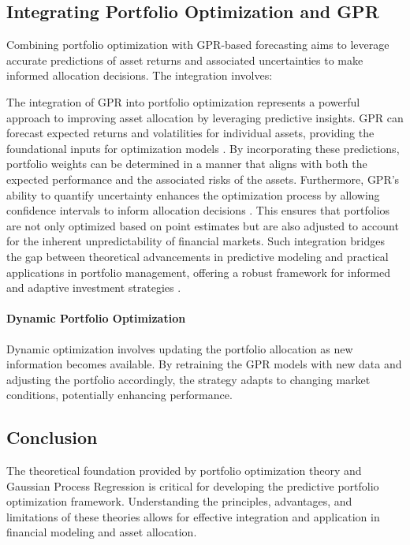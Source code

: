 \subsection{Integrating Portfolio Optimization and \ac{GPR}}

Combining portfolio optimization with GPR-based forecasting aims to leverage accurate predictions of asset returns and associated uncertainties to make informed allocation decisions. The integration involves:

The integration of GPR into portfolio optimization represents a powerful approach to improving asset allocation by leveraging predictive insights. 
GPR can forecast expected returns and volatilities for individual assets, providing the foundational inputs for optimization models \cite{deisenroth2015gaussian, cont2001empirical}. 
By incorporating these predictions, portfolio weights can be determined in a manner that aligns with both the expected performance and the associated risks of the assets. Furthermore, GPR's ability to quantify uncertainty enhances the optimization process by allowing confidence intervals to inform allocation decisions \cite{asmussen2007stochastic}. 
This ensures that portfolios are not only optimized based on point estimates but are also adjusted to account for the inherent unpredictability of financial markets. 
Such integration bridges the gap between theoretical advancements in predictive modeling and practical applications in portfolio management, offering a robust framework for informed and adaptive investment strategies \cite{markowitz1952portfolio}.
\paragraph{Dynamic Portfolio Optimization}

Dynamic optimization involves updating the portfolio allocation as new information becomes available. By retraining the GPR models with new data and adjusting the portfolio accordingly, the strategy adapts to changing market conditions, potentially enhancing performance.

\subsection{Conclusion}

The theoretical foundation provided by portfolio optimization theory and Gaussian Process Regression is critical for developing the predictive portfolio optimization framework. Understanding the principles, advantages, and limitations of these theories allows for effective integration and application in financial modeling and asset allocation.


